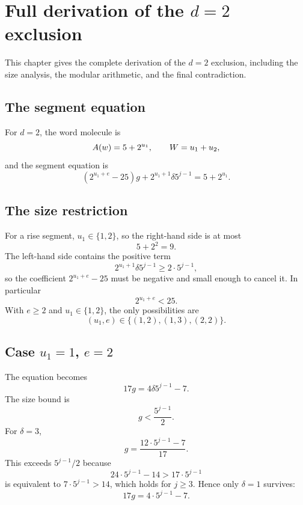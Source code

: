\section{Full derivation of the $d=2$ exclusion}

This chapter gives the complete derivation of the $d=2$ exclusion,
including the size analysis, the modular arithmetic, and the final
contradiction.

\subsection{The segment equation}

For $d=2$, the word molecule is
\begin{equation*}
  A(w)=5+2^{u_1},
  \qquad
  W=u_1+u_2,
\end{equation*}
and the segment equation is
\begin{equation*}
  \left(2^{u_1+e}-25\right)g
    +2^{u_1+1}\delta5^{j-1}=5+2^{u_1}.
\end{equation*}

\subsection{The size restriction}

For a rise segment, $u_1\in\{1,2\}$, so the right-hand side is at
most
\begin{equation*}
  5+2^2=9.
\end{equation*}
The left-hand side contains the positive term
\begin{equation*}
  2^{u_1+1}\delta5^{j-1}\ge2\cdot5^{j-1},
\end{equation*}
so the coefficient $2^{u_1+e}-25$ must be negative and small enough
to cancel it.  In particular
\begin{equation*}
  2^{u_1+e}<25.
\end{equation*}
With $e\ge2$ and $u_1\in\{1,2\}$, the only possibilities are
\begin{equation*}
  (u_1,e)\in\{(1,2),(1,3),(2,2)\}.
\end{equation*}

\subsection{Case $u_1=1$, $e=2$}

The equation becomes
\begin{equation*}
  17g=4\delta5^{j-1}-7.
\end{equation*}
The size bound is
\begin{equation*}
  g<\frac{5^{j-1}}{2}.
\end{equation*}
For $\delta=3$,
\begin{equation*}
  g=\frac{12\cdot5^{j-1}-7}{17}.
\end{equation*}
This exceeds $5^{j-1}/2$ because
\begin{equation*}
  24\cdot5^{j-1}-14>17\cdot5^{j-1}
\end{equation*}
is equivalent to $7\cdot5^{j-1}>14$, which holds for $j\ge3$.  Hence
only $\delta=1$ survives:
\begin{equation*}
  17g=4\cdot5^{j-1}-7.
\end{equation*}

